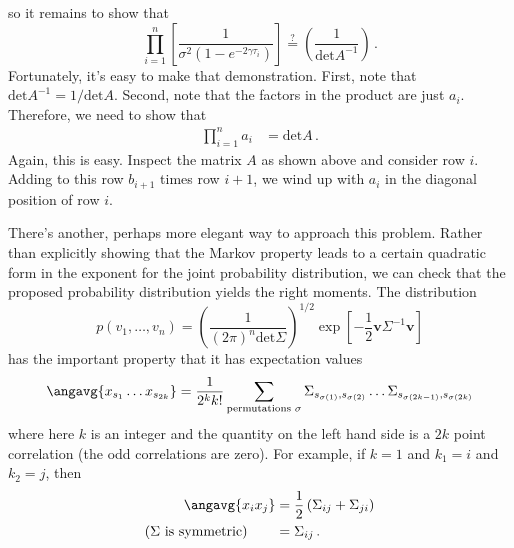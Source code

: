 so it remains to show that
\begin{equation*}
  \prod_{i=1}^n \left[ \frac{1}{\sigma^2 \left( 1 - e^{-2\gamma \tau_i } \right)} \right]
  \stackrel{?}{=}
  \left( \frac{1}{\text{det}A^{-1}} \right)
  \, .
\end{equation*}
Fortunately, it's easy to make that demonstration.
First, note that $\text{det}A^{-1} = 1 / \text{det}A$.
Second, note that the factors in the product are just $a_i$.
Therefore, we need to show that
\begin{align*}
  \prod_{i=1}^n a_i &= \text{det} A
  \, .
\end{align*}
Again, this is easy.
Inspect the matrix $A$ as shown above and consider row $i$.
Adding to this row $b_{i+1}$ times row $i+1$, we wind up with $a_i$ in the diagonal position of row $i$.


There's another, perhaps more elegant way to approach this problem.
Rather than explicitly showing that the Markov property leads to a certain quadratic form in the exponent for the joint probability distribution, we can check that the proposed probability distribution yields the right moments.
The distribution
\begin{equation*}
  p(v_1,\ldots,v_n) = \left( \frac{1}{(2\pi)^n \text{det}\Sigma}\right)^{1/2}
  \exp \left[ - \frac{1}{2} \mathbf{v}\Sigma^{-1} \mathbf{v} \right]
\end{equation*}
has the important property that it has expectation values
\begin{equation*}
  \angavg{x_{s_1} \ldots x_{s_{2k}}} = \frac{1}{2^k k!} \sum_{\text{permutations } \sigma}
  \Sigma_{s_{\sigma(1)}, s_{\sigma(2)}} \ldots \Sigma_{s_{\sigma(2k-1)}, s_{\sigma(2k)}}
\end{equation*}
where here $k$ is an integer and the quantity on the left hand side is a $2k$ point correlation (the odd correlations are zero).
For example, if $k=1$ and $k_1 = i$ and $k_2 = j$, then
\begin{align*}
  \angavg{x_i x_j}
  &= \frac{1}{2} \left( \Sigma_{ij} + \Sigma_{ji} \right) \\
  \text{($\Sigma$ is symmetric)} \qquad &= \Sigma_{ij}
  \, .
\end{align*}

